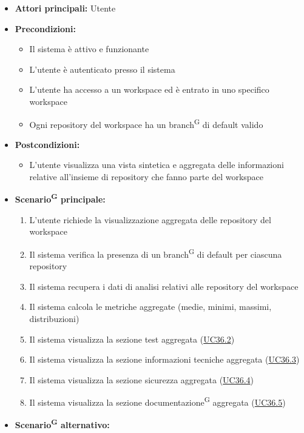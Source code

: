 \documentclass[a4paper, 11pt]{article}
\begin{document}
\begin{itemize}
    \item \textbf{Attori principali:} Utente
    \item \textbf{Precondizioni:}
    \begin{itemize}
        \item Il sistema è attivo e funzionante
        \item L'utente è autenticato presso il sistema
        \item L'utente ha accesso a un workspace ed è entrato in uno specifico workspace
        \item Ogni repository del workspace ha un branch\textsuperscript{G} di default valido
    \end{itemize}
    \item \textbf{Postcondizioni:}
    \begin{itemize}
        \item L'utente visualizza una vista sintetica e aggregata delle informazioni relative all'insieme di repository che fanno parte del workspace
    \end{itemize}
    \item \textbf{Scenario\textsuperscript{G} principale:}
    \begin{enumerate}
        \item L'utente richiede la visualizzazione aggregata delle repository del workspace
        \item Il sistema verifica la presenza di un branch\textsuperscript{G} di default per ciascuna repository
        \item Il sistema recupera i dati di analisi relativi alle repository del workspace
        \item Il sistema calcola le metriche aggregate (medie, minimi, massimi, distribuzioni)
        \item Il sistema visualizza la sezione test aggregata (\hyperref[UC36.2]{UC36.2})
        \item Il sistema visualizza la sezione informazioni tecniche aggregata (\hyperref[UC36.3]{UC36.3})
        \item Il sistema visualizza la sezione sicurezza aggregata (\hyperref[UC36.4]{UC36.4})
        \item Il sistema visualizza la sezione documentazione\textsuperscript{G} aggregata (\hyperref[UC36.5]{UC36.5})
    \end{enumerate}
    \item \textbf{Scenario\textsuperscript{G} alternativo:}
    \begin{itemize}


\end{itemize}
\end{itemize}
\end{document}
